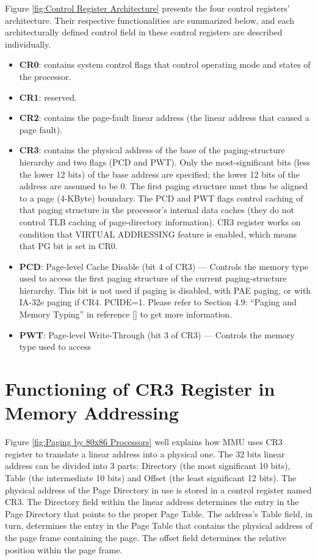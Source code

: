 Figure \ref{fig:Control Register Architecture} presents the four control registers’ architecture. Their respective functionalities are
summarized below, and each architecturally defined control field in these control registers are described individually.

\begin{itemize}
 \item\textbf{CR0}: contains system control flags that control operating mode and states of the processor.
 \item\textbf{CR1}: reserved.
 \item\textbf{CR2}: contains the page-fault linear address (the linear address that caused a page fault).
 \item\textbf{CR3}: contains the physical address of the base of the paging-structure hierarchy and two flags (PCD and PWT). Only the
 most-significant bits (less the lower 12 bits) of the base address are specified; the lower 12 bits of the address are assumed to be
 0. The first paging structure must thus be aligned to a page (4-KByte) boundary. The PCD and PWT flags control caching of that paging
 structure in the processor’s internal data caches (they do not control TLB caching of page-directory information). CR3 register works
 on condition that VIRTUAL ADDRESSING feature is enabled, which means that PG bit is set in CR0.
 \item\textbf{PCD}: Page-level Cache Disable (bit 4 of CR3) — Controls the memory type used to access the first paging structure of 
 the current paging-structure hierarchy. This bit is not used if paging is disabled, with PAE paging, or with IA-32e paging if CR4.
 PCIDE=1. Please refer to Section 4.9: “Paging and Memory Typing” in reference [] to get more information.
 \item\textbf{PWT}: Page-level Write-Through (bit 3 of CR3) — Controls the memory type used to access 
\end{itemize}

\section{Functioning of CR3 Register in Memory Addressing}
Figure \ref{fig:Paging by 80x86 Processors} well explains how MMU uses CR3 register to translate a linear address into a physical one.
The 32 bits linear address can be divided into 3 parts: Directory (the most significant 10 bits), Table (the intermediate 10 bits) and
Offset (the least significant 12 bits). The physical address of the Page Directory in use is stored in a control register named CR3. 
The Directory field within the linear address determines the entry in the Page Directory that points to the proper Page Table. The 
address’s Table field, in turn, determines the entry in the Page Table that contains the physical address of the page frame containing
the page. The offset field determines the relative position within the page frame.

